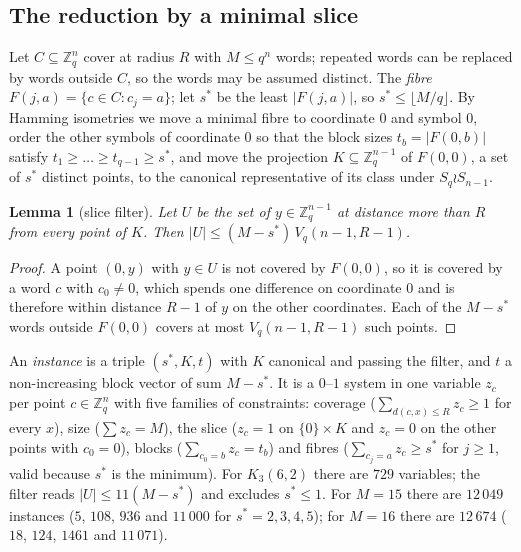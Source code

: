 \documentclass[11pt]{amsart}
\newtheorem{lemma}[theorem]{Lemma}
\theoremstyle{definition}
\theoremstyle{remark}
\begin{document}
\subsection*{The reduction by a minimal slice}
Let $C\subseteq\mathbb{Z}_q^n$ cover at radius $R$ with $M\le q^n$ words; repeated words can be replaced by words outside $C$, so the words may be assumed distinct.
The \emph{fibre} $F(j,a)=\{c\in C: c_j=a\}$; let $s^*$ be the least $|F(j,a)|$, so $s^*\le\lfloor M/q\rfloor$.
By Hamming isometries we move a minimal fibre to coordinate $0$ and symbol $0$, order the other symbols of coordinate $0$ so that the block sizes $t_b=|F(0,b)|$ satisfy $t_1\ge\dots\ge t_{q-1}\ge s^*$, and move the projection $K\subseteq\mathbb{Z}_q^{n-1}$ of $F(0,0)$, a set of $s^*$ distinct points, to the canonical representative of its class under $S_q\wr S_{n-1}$.

\begin{lemma}[slice filter]\label{lem:slice}
Let $U$ be the set of $y\in\mathbb{Z}_q^{n-1}$ at distance more than $R$ from every point of $K$. Then $|U|\le (M-s^*)\,V_q(n-1,R-1)$.
\end{lemma}
\begin{proof}
A point $(0,y)$ with $y\in U$ is not covered by $F(0,0)$, so it is covered by a word $c$ with $c_0\ne 0$, which spends one difference on coordinate $0$ and is therefore within distance $R-1$ of $y$ on the other coordinates. Each of the $M-s^*$ words outside $F(0,0)$ covers at most $V_q(n-1,R-1)$ such points.
\end{proof}

An \emph{instance} is a triple $(s^*,K,t)$ with $K$ canonical and passing the filter, and $t$ a non-increasing block vector of sum $M-s^*$.
It is a $0$--$1$ system in one variable $z_c$ per point $c\in\mathbb{Z}_q^n$ with five families of constraints: coverage ($\sum_{d(c,x)\le R}z_c\ge 1$ for every $x$), size ($\sum z_c=M$), the slice ($z_c=1$ on $\{0\}\times K$ and $z_c=0$ on the other points with $c_0=0$), blocks ($\sum_{c_0=b}z_c=t_b$) and fibres ($\sum_{c_j=a}z_c\ge s^*$ for $j\ge1$, valid because $s^*$ is the minimum).
For $K_3(6,2)$ there are $729$ variables; the filter reads $|U|\le 11(M-s^*)$ and excludes $s^*\le 1$.
For $M=15$ there are $12\,049$ instances ($5$, $108$, $936$ and $11\,000$ for $s^*=2,3,4,5$); for $M=16$ there are $12\,674$ ($18$, $124$, $1461$ and $11\,071$).
\end{document}
